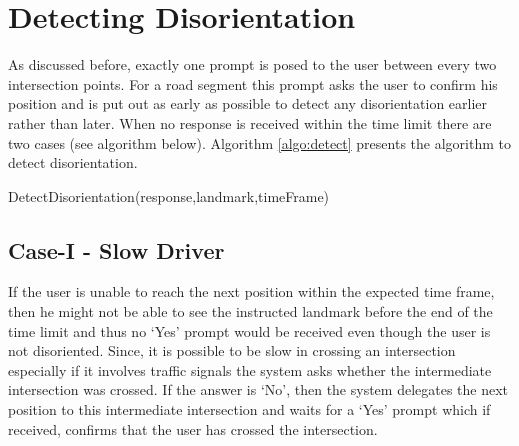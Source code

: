 \documentclass{iitkthesis}
\begin{document}
\section{Detecting Disorientation}
As discussed before, exactly one prompt is posed to the user between 
every two intersection points. For a road segment this prompt asks the 
user to confirm his position and is put out as early as possible 
to detect any disorientation earlier rather than later. When no response
is received within the time limit there are two cases (see 
algorithm below).  Algorithm \ref{algo:detect} presents the algorithm to 
detect disorientation.

\begin{algorithm}[H]
\label{algo:detect}
\SetVline
\dontprintsemicolon
{}
\BlankLine

\caption{DetectDisorientation(response,landmark,timeFrame)}
\end{algorithm}
\subsection*{Case-I - Slow Driver}
If the user is unable to reach the next position within the expected time 
frame, then he might not be able to see the instructed landmark before 
the end of the time limit and thus no `Yes' prompt would be received even 
though the user is not disoriented. Since, it is  possible to be 
slow in crossing an intersection especially if it involves traffic 
signals the system asks whether 
the intermediate intersection was crossed. If the answer is `No', then 
the system delegates the next position to this intermediate intersection 
and waits for a `Yes' prompt which if received, confirms that the user 
has crossed the intersection. 
\end{document}
